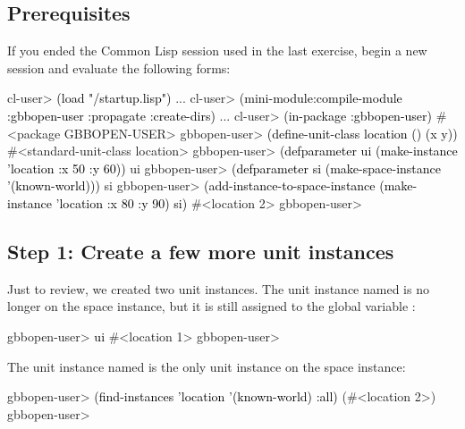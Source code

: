 \documentclass[10pt,twoside,english,pdftex]{article}
\begin{document}
\fndocrule

\subsection*{Prerequisites}

%
%
%
If you ended the Common Lisp session used in the last exercise, begin a new
session and evaluate the following forms:
%
\W\supp
\begin{example}
\textcolor{darkergray}{%
  cl-user> \textcolor{black}{(load "/startup.lisp")}
     ...
  cl-user> \textcolor{black}{(mini-module:compile-module :gbbopen-user :propagate :create-dirs)}
     ...
  cl-user> \textcolor{black}{(in-package :gbbopen-user)}
  #<package GBBOPEN-USER>
  gbbopen-user> \textcolor{black}{(define-unit-class location ()
                   (x y))}
  #<standard-unit-class location>
  gbbopen-user> \textcolor{black}{(defparameter ui (make-instance 'location :x 50 :y 60))}
  ui
  gbbopen-user> \textcolor{black}{(defparameter si (make-space-instance '(known-world)))}
  si
  gbbopen-user> \textcolor{black}{(add-instance-to-space-instance 
                   (make-instance 'location :x 80 :y 90)
                   si)}
  #<location 2>
  gbbopen-user>}
\end{example}

\subsection*{Step 1: Create a few more unit instances}

Just to review, we created two  unit instances.  The unit
instance named  is no longer on the  space instance,
but it is still assigned to the global variable :
%
%
\W\supp
\begin{example}
\textcolor{darkergray}{%
  gbbopen-user> \textcolor{black}{ui}
  #<location 1> 
  gbbopen-user>}
\end{example}
%
The  unit instance named  is the only 
unit instance on the  space instance:
%
%
\W\supp\notpretop
\begin{example}
\textcolor{darkergray}{%
  gbbopen-user> \textcolor{black}{(find-instances 'location '(known-world) :all)}
  (#<location 2>)
  gbbopen-user>}
\end{example}
\end{document}
